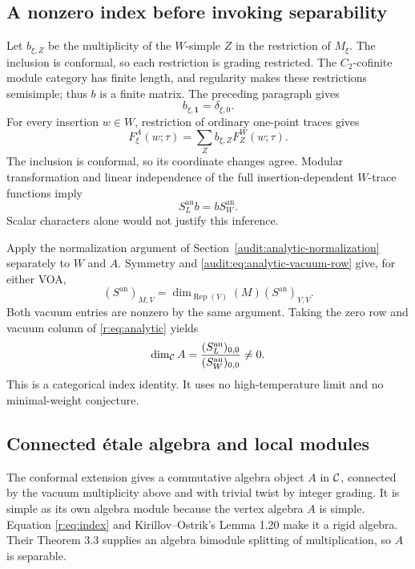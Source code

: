 \documentclass[11pt,a4paper]{article}
\numberwithin{equation}{section}
\theoremstyle{definition}\newtheorem{definition}[theorem]{Definition}
\theoremstyle{remark}\newtheorem{remark}[theorem]{Remark}
\newcommand{\one}{\mathbf1}\newcommand{\B}{\mathcal B}\newcommand{\W}{W_N}
\newcommand{\Rep}{\operatorname{Rep}}\newcommand{\Ext}{\operatorname{Ext}}
\begin{document}
\subsection{A nonzero index before invoking separability}

Let \(b_{\xi,Z}\) be the multiplicity of the \(W\)-simple \(Z\) in
the restriction of \(M_\xi\). The inclusion is conformal, so each
restriction is grading restricted. The $C_2$-cofinite module category
has finite length, and regularity makes these restrictions semisimple;
thus $b$ is a finite matrix. The preceding paragraph gives
\[
                         b_{\xi,\one}=\delta_{\xi,0}.
\]
For every insertion \(w\in W\), restriction of ordinary one-point
traces gives
\[
 F^A_\xi(w;\tau)=\sum_Zb_{\xi,Z}F^W_Z(w;\tau).
\]
The inclusion is conformal, so its coordinate changes agree.
Modular transformation and linear independence of the full
insertion-dependent \(W\)-trace functions imply
\begin{equation}\label{r:eq:analytic}
                  S_L^{\mathrm{an}}b=bS_W^{\mathrm{an}}.
\end{equation}
Scalar characters alone would not justify this inference.

Apply the normalization argument of
Section~\ref{audit:analytic-normalization} separately to $W$ and $A$.
Symmetry and \eqref{audit:eq:analytic-vacuum-row} give, for either VOA,
\[
 (S^{\mathrm{an}})_{M,V}
       =\dim_{\Rep(V)}(M)(S^{\mathrm{an}})_{V,V}.
\]
Both vacuum entries are nonzero by the same argument.
Taking the zero row and vacuum column of \eqref{r:eq:analytic} yields
\begin{equation}\label{r:eq:index}
       \dim_{\mathcal C}A
         =\frac{(S_L^{\mathrm{an}})_{0,0}}
                 {(S_W^{\mathrm{an}})_{0,0}}\ne0.
\end{equation}
This is a categorical index identity. It uses no
high-temperature limit and no minimal-weight conjecture.

\subsection{Connected \'etale algebra and local modules}

The conformal extension gives a commutative algebra object \(A\)
in \(\mathcal C\), connected by the vacuum multiplicity above and with
trivial twist by integer grading. It is simple as its own algebra
module because the vertex algebra \(A\) is simple. Equation
\eqref{r:eq:index} and Kirillov--Ostrik's Lemma 1.20 \cite{ko}
make it a rigid algebra. Their Theorem 3.3 supplies an algebra
bimodule splitting of multiplication, so \(A\) is separable.
\end{document}
